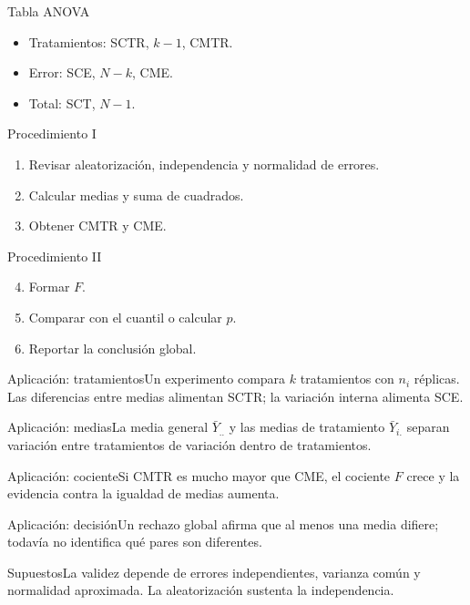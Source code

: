 \documentclass[10pt,aspectratio=169]{beamer}
\begin{document}
\begin{frame}{Tabla ANOVA}\small\begin{itemize}\item Tratamientos: SCTR, $k-1$, CMTR.\item Error: SCE, $N-k$, CME.\item Total: SCT, $N-1$.\end{itemize}\end{frame}
\begin{frame}{Procedimiento I}\small\begin{enumerate}\item Revisar aleatorización, independencia y normalidad de errores.\item Calcular medias y suma de cuadrados.\item Obtener CMTR y CME.\end{enumerate}\end{frame}
\begin{frame}{Procedimiento II}\small\begin{enumerate}\setcounter{enumi}{3}\item Formar $F$.\item Comparar con el cuantil o calcular $p$.\item Reportar la conclusión global.\end{enumerate}\end{frame}
\begin{frame}{Aplicación: tratamientos}\small Un experimento compara $k$ tratamientos con $n_i$ réplicas. Las diferencias entre medias alimentan SCTR; la variación interna alimenta SCE.\end{frame}
\begin{frame}{Aplicación: medias}\small La media general $\bar Y_{..}$ y las medias de tratamiento $\bar Y_{i.}$ separan variación entre tratamientos de variación dentro de tratamientos.\end{frame}
\begin{frame}{Aplicación: cociente}\small Si CMTR es mucho mayor que CME, el cociente $F$ crece y la evidencia contra la igualdad de medias aumenta.\end{frame}
\begin{frame}{Aplicación: decisión}\small Un rechazo global afirma que al menos una media difiere; todavía no identifica qué pares son diferentes.\end{frame}
\begin{frame}{Supuestos}\small La validez depende de errores independientes, varianza común y normalidad aproximada. La aleatorización sustenta la independencia.\end{frame}
\end{document}

